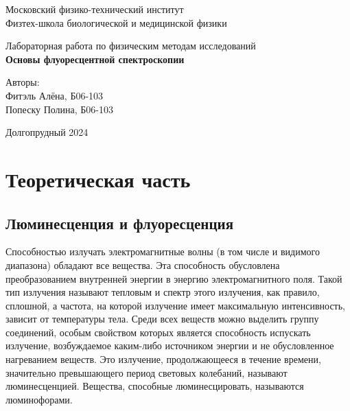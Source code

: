 \documentclass[a4paper,12pt]{article}
\title{}
\author{Ксения Зайцева}
\date{}
\begin{document}
 

\renewcommand{\figurename}{\textbf{Рисунок}}		%
\renewcommand{\tablename}{\textbf{Таблица}}		%

\begin{titlepage}
\begin{center} 
 
\large Московский физико-технический институт\\
Физтех-школа биологической и медицинской физики\\
\vspace{7cm}
{\huge
\begin{center}
    {Лабораторная работа по физическим методам исследований}\\
    {\bf  Основы флуоресцентной спектроскопии	}
\end{center}
}
\end{center}
\begin{flushright}
{\LARGE Авторы:\\ Фитэль Алёна, Б06-103\\ Попеску Полина, Б06-103 \\ }

\end{flushright}

\begin{center}
\vfill Долгопрудный 2024
\end{center}
\end{titlepage}

\newpage
\setcounter{page}{2}


\section*{Теоретическая часть}
\subsection*{Люминесценция и флуоресценция}
Способностью излучать электромагнитные волны (в том числе и видимого диапазона)
обладают все вещества. Эта способность обусловлена преобразованием внутренней энергии
в энергию электромагнитного поля. Такой тип излучения называют тепловым и спектр этого
излучения, как правило, сплошной, а частота, на которой излучение имеет максимальную
интенсивность, зависит от температуры тела.
Среди всех веществ можно выделить группу соединений, особым свойством которых
является способность испускать излучение, возбуждаемое каким-либо источником энергии и
не обусловленное нагреванием веществ. Это излучение, продолжающееся в течение времени,
значительно превышающего период световых колебаний, называют люминесценцией.
Вещества, способные люминесцировать, называются люминофорами.
\end{document}
